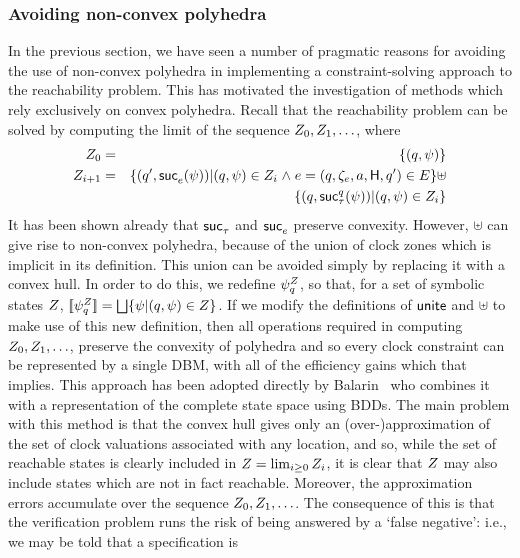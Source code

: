 {\subsubsection{Avoiding non-convex polyhedra}
In the previous section, we have seen a number of pragmatic reasons
for avoiding the use of non-convex polyhedra in implementing a
constraint-solving approach to the reachability problem. This has motivated
the investigation of methods which rely exclusively on convex polyhedra.
Recall that the reachability problem can be solved by computing the limit
of the sequence $Z_0, Z_1,\ldots$, where
\begin{eqnarray*}
Z_0 & = & \{(q,{\psi})\} \\ 
Z_{i+1} & = & \{(q',\mathop{{\sf suc}_{e}^{}}({\psi})) |
                  (q,{\psi}) \in Z_i \mathrel{\wedge} 
                  e = (q,{\zeta}_e,a,{\sf H},q') \in 
                  E\} \uplus \\
         &   & \{(q,\mathop{{\sf suc}_{\tau}^{q}}({\psi})) | (q,{\psi}) \in
                  Z_i\}  
\end{eqnarray*} 
It has been shown already that $\mathop{{\sf suc}_{\tau}^{}}$ and $\mathop{{\sf suc}_{e}^{}}$
preserve convexity. However, $\uplus$ can give
rise to non-convex polyhedra, because of the union of clock zones
which is implicit in its definition. This union can be
avoided simply by replacing it with a convex hull. In order to do this,
we redefine ${\psi}_q^Z$, so that, for a set of
symbolic states $Z$, ${\lbrack\!\lbrack}{\psi}_q^Z{\rbrack\!\rbrack} =
\bigsqcup\{{\psi} | (q,{\psi}) \in Z\}$. If we modify the definitions
of $\mathop{\sf unite}$ and $\uplus$ to make use of this new definition, then all
operations required in computing $Z_0, Z_1, \ldots$, preserve the
convexity of polyhedra and so every clock constraint can be
represented by a single DBM, with all of the efficiency gains which
that implies. This approach has been adopted directly by
Balarin~\cite{bal:96} who combines it with a representation of the
complete state space using BDDs. The main problem with this method is
that the convex hull gives only an (over-)approximation of the set of
clock valuations associated with any location, and so, while the set of
reachable states is clearly included in $Z=\lim_{i \geq 0}Z_i$, it is clear that $Z$ may also include states 
which are not in fact reachable. Moreover, the approximation errors
accumulate over the sequence $Z_0, Z_1,\ldots$. The consequence of
this is that the verification problem runs the risk of being answered
by a `false negative': i.e.,  we may be told that a specification is
}
